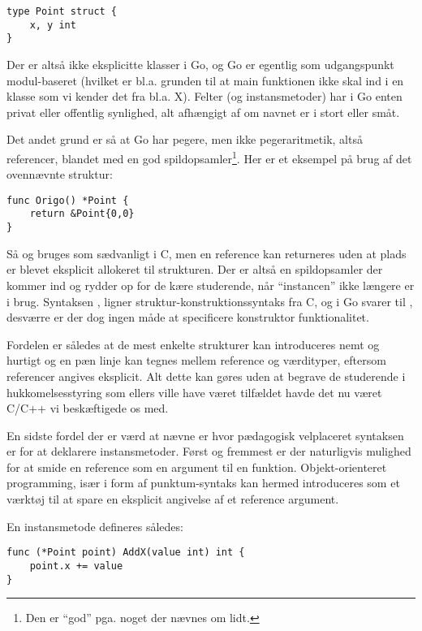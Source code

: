 \begin{lstlisting}
type Point struct {
	x, y int
}
\end{lstlisting}

Der er altså ikke eksplicitte klasser i Go, og Go er egentlig som udgangspunkt
modul-baseret (hvilket er bl.a. grunden til at main funktionen ikke skal ind i
en klasse som vi kender det fra bl.a. X). Felter (og instansmetoder) har i Go
enten privat eller offentlig synlighed, alt afhængigt af om navnet er i stort
eller småt.

Det andet grund er så at Go har pegere, men ikke pegeraritmetik, altså
referencer, blandet med en god spildopsamler\footnote{Den er ``god'' pga. noget
der nævnes om lidt.}. Her er et eksempel på brug af det ovennævnte struktur:

\begin{lstlisting}
func Origo() *Point {
	return &Point{0,0}
}
\end{lstlisting}

Så \mono{*} og \mono{\&} bruges som sædvanligt i C, men en reference kan
returneres uden at plads er blevet eksplicit allokeret til strukturen. Der er
altså en spildopsamler der kommer ind og rydder op for de kære studerende, når
``instancen'' ikke længere er i brug. Syntaksen , ligner
struktur-konstruktionssyntaks fra C, og i Go svarer til ,
desværre er der dog ingen måde at specificere konstruktor funktionalitet.

Fordelen er således at de mest enkelte strukturer kan introduceres nemt og
hurtigt og en pæn linje kan tegnes mellem reference og værdityper, eftersom
referencer angives eksplicit. Alt dette kan gøres uden at begrave de studerende
i hukkomelsesstyring som ellers ville have været tilfældet havde det nu været
C/C++ vi beskæftigede os med.

En sidste fordel der er værd at nævne er hvor pædagogisk velplaceret syntaksen
er for at deklarere instansmetoder. Først og fremmest er der naturligvis
mulighed for at smide en reference som en argument til en funktion.
Objekt-orienteret programming, især i form af punktum-syntaks kan hermed introduceres
som et værktøj til at spare en eksplicit angivelse af et reference argument.

En instansmetode defineres således:

\begin{lstlisting}
func (*Point point) AddX(value int) int {
	point.x += value
}
\end{lstlisting}

